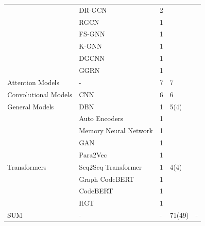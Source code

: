 \begin{table}[h]
{\begin{tabular}{lllll}
                                  & DR-GCN                & 2       &                      &      \cite{liu2021combining,
zhuang2020smart}   \\
                                  & RGCN                  & 1       &                      &        \cite{zheng2021vulspg} \\
                                  & FS-GNN                & 1       &                     &      \cite{cao2022mvd}    \\
                                  & K-GNN                 & 1       &                      &       \cite{cheng2021deepwukong}  \\
                                  & DGCNN                 & 1       &                      &      \cite{phan2017convolutional}   \\
                                  & GGRN                  & 1       &                      &      \cite{zhou2019devign}   \\
                                  \hline
Attention Models  & -    & 7         & \multirow{1}{*}{7}   &           \cite{le2021deepcva,
3360588,
zou2019mu,
duan2019vulsniper,
cheng2022path,
liu2021smart,
zhang2022reentrancy} \\
\hline
Convolutional Models              & CNN                   & 6       & 6                     &      \cite{hoang2019deepjit,
yan2021han,
3429444,
8594942,
li2017software,
filus2020random}  \\
\hline
\multirow{1}{*}{General Models}   &   DBN                   & 1       &         5(4)             &     \cite{wang2016automatically}     \\
                                  & Auto Encoders         & 1       &                     &       \cite{le2018maximal}   \\
                                  & Memory Neural Network & 1       &                      &       \cite{hoang2019deepjit}  \\
                                  & GAN                   & 1       &                      &       \cite{3327890} \\
                                  & Para2Vec              & 1       &                      &       \cite{le2018maximal} \\
                                  \hline
Transformers                      &     Seq2Seq Transformer    & 1       &     4(4)                &     \cite{chen2021neural}      \\
                                  &     Graph CodeBERT    & 1       &                     &     \cite{wu2021peculiar}      \\
                                  &     CodeBERT    & 1       &                     &     \cite{ni2022best}      \\
                                  &     HGT    & 1       &                     &     \cite{yang2022source}      \\
\hline
SUM              & -                   & -       & 71(49)    &     -  \\
\bottomrule
\end{tabular}
}
\label{tbl:DL_dist}
\end{table}

